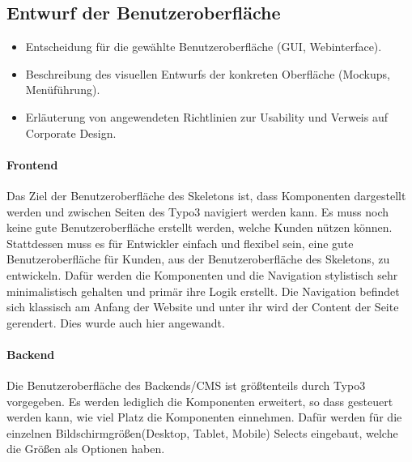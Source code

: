 

\subsection{Entwurf der Benutzeroberfläche}
\label{sec:Benutzeroberflaeche} 
\begin{itemize}
	\item Entscheidung für die gewählte Benutzeroberfläche (\zB GUI, Webinterface).
	\item Beschreibung des visuellen Entwurfs der konkreten Oberfläche (\zB Mockups, Menüführung).
	\item \Ggfs Erläuterung von angewendeten Richtlinien zur Usability und Verweis auf Corporate Design.
\end{itemize}

\paragraph{Frontend} 
\linebreak
Das Ziel der Benutzeroberfläche des Skeletons ist, dass Komponenten dargestellt werden und zwischen Seiten des Typo3 navigiert werden kann. Es muss noch keine gute Benutzeroberfläche erstellt werden, welche Kunden nützen können. Stattdessen muss es für Entwickler einfach und flexibel sein, eine gute Benutzeroberfläche für Kunden, aus der Benutzeroberfläche des Skeletons, zu entwickeln. Dafür werden die Komponenten und die Navigation stylistisch sehr minimalistisch gehalten und primär ihre Logik erstellt. Die Navigation befindet sich klassisch am Anfang der Website und unter ihr wird der Content der Seite gerendert. Dies wurde auch hier angewandt.


\paragraph{Backend} 
\linebreak 
Die Benutzeroberfläche des Backends/CMS ist größtenteils durch Typo3 vorgegeben. Es werden lediglich die Komponenten erweitert, so dass gesteuert werden kann, wie viel Platz die Komponenten einnehmen. Dafür werden für die einzelnen Bildschirmgrößen(Desktop, Tablet, Mobile) Selects eingebaut, welche die Größen als Optionen haben.

